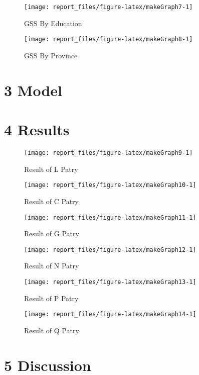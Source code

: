 \documentclass[
  12pt,
]{article}
\begin{document}
\begin{figure}
\texttt{[image: report\_files/figure-latex/makeGraph7-1]} \caption{GSS By Education}\label{fig:makeGraph7}
\end{figure}

\begin{figure}
\texttt{[image: report\_files/figure-latex/makeGraph8-1]} \caption{GSS By Province}\label{fig:makeGraph8}
\end{figure}

\hypertarget{model}{%
\section{3 Model}\label{model}}

\hypertarget{results}{%
\section{4 Results}\label{results}}

\begin{figure}
\texttt{[image: report\_files/figure-latex/makeGraph9-1]} \caption{Result of L Patry}\label{fig:makeGraph9}
\end{figure}

\begin{figure}
\texttt{[image: report\_files/figure-latex/makeGraph10-1]} \caption{Result of C Patry}\label{fig:makeGraph10}
\end{figure}

\begin{figure}
\texttt{[image: report\_files/figure-latex/makeGraph11-1]} \caption{Result of G Patry}\label{fig:makeGraph11}
\end{figure}

\begin{figure}
\texttt{[image: report\_files/figure-latex/makeGraph12-1]} \caption{Result of N Patry}\label{fig:makeGraph12}
\end{figure}

\begin{figure}
\texttt{[image: report\_files/figure-latex/makeGraph13-1]} \caption{Result of P Patry}\label{fig:makeGraph13}
\end{figure}

\begin{figure}
\texttt{[image: report\_files/figure-latex/makeGraph14-1]} \caption{Result of Q Patry}\label{fig:makeGraph14}
\end{figure}

\hypertarget{discussion}{%
\section{5 Discussion}\label{discussion}}
\end{document}
